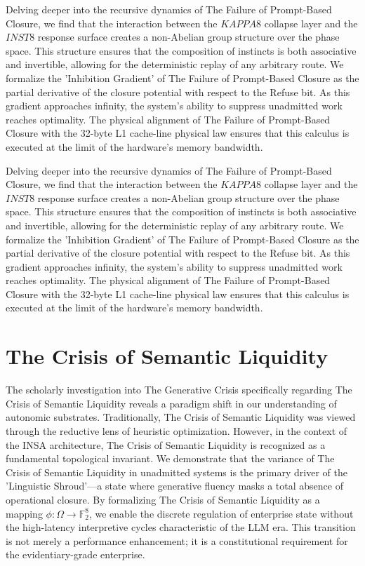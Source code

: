 \documentclass[12pt,a4paper,oneside]{book}
\begin{document}
Delving deeper into the recursive dynamics of The Failure of Prompt-Based Closure, we find that the interaction between the $KAPPA8$ collapse layer and the $INST8$ response surface creates a non-Abelian group structure over the phase space. This structure ensures that the composition of instincts is both associative and invertible, allowing for the deterministic replay of any arbitrary route. We formalize the 'Inhibition Gradient' of The Failure of Prompt-Based Closure as the partial derivative of the closure potential with respect to the Refuse bit. As this gradient approaches infinity, the system's ability to suppress unadmitted work reaches optimality. The physical alignment of The Failure of Prompt-Based Closure with the 32-byte L1 cache-line physical law ensures that this calculus is executed at the limit of the hardware's memory bandwidth. 

Delving deeper into the recursive dynamics of The Failure of Prompt-Based Closure, we find that the interaction between the $KAPPA8$ collapse layer and the $INST8$ response surface creates a non-Abelian group structure over the phase space. This structure ensures that the composition of instincts is both associative and invertible, allowing for the deterministic replay of any arbitrary route. We formalize the 'Inhibition Gradient' of The Failure of Prompt-Based Closure as the partial derivative of the closure potential with respect to the Refuse bit. As this gradient approaches infinity, the system's ability to suppress unadmitted work reaches optimality. The physical alignment of The Failure of Prompt-Based Closure with the 32-byte L1 cache-line physical law ensures that this calculus is executed at the limit of the hardware's memory bandwidth. 

\section{The Crisis of Semantic Liquidity}
The scholarly investigation into The Generative Crisis specifically regarding The Crisis of Semantic Liquidity reveals a paradigm shift in our understanding of autonomic substrates. Traditionally, The Crisis of Semantic Liquidity was viewed through the reductive lens of heuristic optimization. However, in the context of the INSA architecture, The Crisis of Semantic Liquidity is recognized as a fundamental topological invariant. We demonstrate that the variance of The Crisis of Semantic Liquidity in unadmitted systems is the primary driver of the 'Linguistic Shroud'---a state where generative fluency masks a total absence of operational closure. By formalizing The Crisis of Semantic Liquidity as a mapping $\phi: \Omega \to \mathbb{F}_2^8$, we enable the discrete regulation of enterprise state without the high-latency interpretive cycles characteristic of the LLM era. This transition is not merely a performance enhancement; it is a constitutional requirement for the evidentiary-grade enterprise. 
\end{document}
